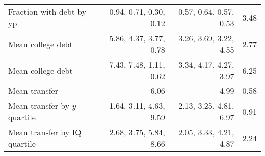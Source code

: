 \begin{tabular}{lrrr}
Fraction with debt by yp & 0.94, 0.71, 0.30, 0.12  & 0.57, 0.64, 0.57, 0.53  & 3.48  \\ 
Mean college debt & 5.86, 4.37, 3.77, 0.78  & 3.26, 3.69, 3.22, 4.55  & 2.77  \\ 
Mean college debt & 7.43, 7.48, 1.11, 0.62  & 3.34, 4.17, 4.27, 3.97  & 6.25  \\ 
Mean transfer & 6.06  & 4.99  & 0.58  \\ 
Mean transfer by $y$ quartile & 1.64, 3.11, 4.63, 9.59  & 2.13, 3.25, 4.81, 6.97  & 0.91  \\ 
Mean transfer by IQ quartile & 2.68, 3.75, 5.84, 8.66  & 2.05, 3.33, 4.21, 4.87  & 2.24  \\ 
\hline
\end{tabular}%
